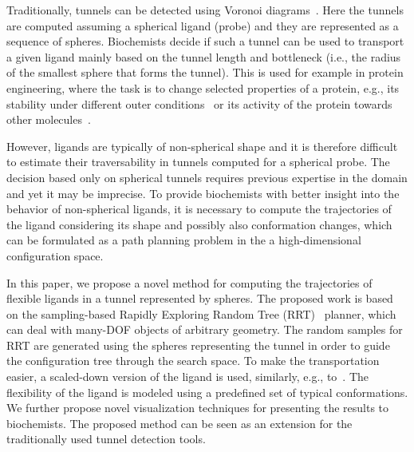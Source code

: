 \documentclass{svmult}
\begin{document}
Traditionally, tunnels can be detected using Voronoi diagrams~\cite{yaffe2008,caver3}.
Here the tunnels are computed assuming a spherical ligand (probe) and they are represented as a sequence of spheres.
Biochemists decide if such a tunnel can be used to transport a given ligand mainly based on the tunnel length and bottleneck (i.e., the radius of the smallest sphere that forms the tunnel).
This is used for example in protein engineering, where the task is to change selected properties of a protein, e.g., its stability under different outer conditions~\cite{Koudelakova2013} or its activity of the protein towards other molecules~\cite{Pavlova2009}.

However, ligands are typically of non-spherical shape and it is therefore difficult to estimate their traversability in tunnels computed for a spherical probe.
The decision based only on spherical tunnels requires previous expertise in the domain and yet it may be imprecise.
To provide biochemists with better insight into the behavior of non-spherical ligands, it is necessary to compute the trajectories of the ligand considering its shape and possibly also conformation changes, which can be formulated as a path planning problem in the a high-dimensional configuration space.

In this paper, we propose a novel method for computing the trajectories of flexible ligands in a tunnel represented by spheres.
The proposed work is based on the sampling-based Rapidly Exploring Random Tree (RRT)~\cite{lavalleRRT} planner, which
can deal with many-DOF objects of arbitrary geometry.
The random samples for RRT are generated using the spheres representing the tunnel in order to guide the configuration tree through the search space.
To make the transportation easier, a scaled-down version of the ligand is used, similarly, e.g., to~\cite{cortes2005path}.
The flexibility of the ligand is modeled using a predefined set of typical conformations.
We further propose novel visualization techniques for presenting the results to biochemists.
The proposed method can be seen as an extension for the traditionally used tunnel detection tools.
\end{document}
